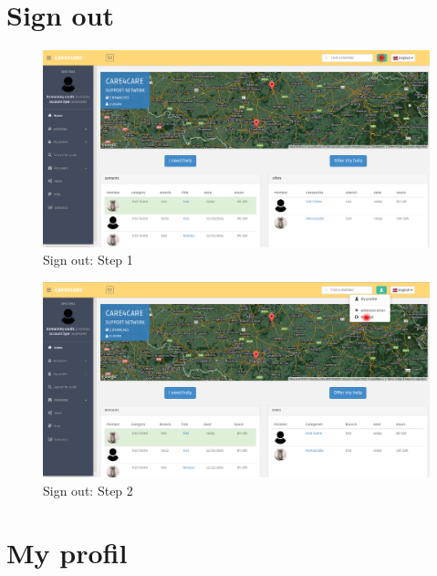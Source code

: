 \documentclass{article}
\begin{document}
\section{Sign out}
\begin{figure}[!ht]
   \includegraphics[width=\textwidth]{img/out1.png}
   \caption{Sign out: Step 1}
\end{figure}
\begin{figure}[!ht]
   \includegraphics[width=\textwidth]{img/out2.png}
   \caption{Sign out: Step 2}
\end{figure}

\clearpage
\section{My profil}
\end{document}
